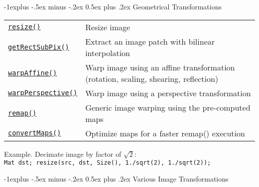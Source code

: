 \documentclass[10pt,landscape]{article}
\makeatletter
\renewcommand{\subsection}{\@startsection{subsection}{2}{0mm}%
                                {-1explus -.5ex minus -.2ex}%
                                {0.5ex plus .2ex}%
                                {\normalfont\normalsize\bfseries}}
\makeatother
\begin{document}
\begin{multicols}{3}
\subsection{Geometrical Transformations}

\begin{tabular}{@{}p{\the\MyLen}%
                @{}p{\linewidth-\the\MyLen}@{}}
\texttt{\href{http://opencv.willowgarage.com/documentation/cpp/geometric_image_transformations.html\#cv-resize}{resize()}} & Resize image \\

\texttt{\href{http://opencv.willowgarage.com/documentation/cpp/geometric_image_transformations.html\#cv-getrectsubpix}{getRectSubPix()}} & Extract an image patch with bilinear interpolation \\

\texttt{\href{http://opencv.willowgarage.com/documentation/cpp/geometric_image_transformations.html\#cv-warpaffine}{warpAffine()}} & Warp image using an affine transformation (rotation, scaling, shearing, reflection)\\

\texttt{\href{http://opencv.willowgarage.com/documentation/cpp/geometric_image_transformations.html\#cv-warpperspective}{warpPerspective()}} & Warp image using a perspective transformation\\

\texttt{\href{http://opencv.willowgarage.com/documentation/cpp/geometric_image_transformations.html\#cv-remap}{remap()}} & Generic image warping using the pre-computed maps\\

\texttt{\href{http://opencv.willowgarage.com/documentation/cpp/geometric_image_transformations.html\#cv-convertmaps}{convertMaps()}} & Optimize maps for a faster remap() execution\\

\end{tabular}

\begin{tabbing}
Example. Decimate image by factor of $\sqrt{2}$:\\
\texttt{Mat dst; resize(src, dst, Size(), 1./sqrt(2), 1./sqrt(2));}
\end{tabbing}

\subsection{Various Image Transformations}


\end{multicols}
\end{document}
